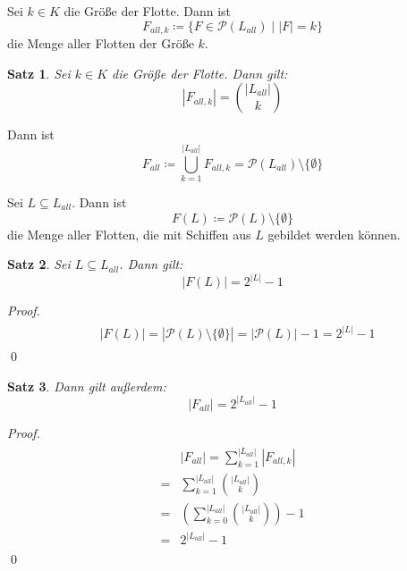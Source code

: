 \documentclass[a4paper,12pt]{llncs}
\numberwithin{equation}{section}
\newtheorem{satz}{Satz}
\begin{document}
\begin{definition}
Sei $k \in K$ die Größe der Flotte.
Dann ist
\[
F_{all,k} \coloneqq\{F \in \mathcal{P}(L_{all}) \mid |F| = k\}
\]
die Menge aller Flotten der Größe $k$.
\end{definition}

\begin{satz}
Sei $k \in K$ die Größe der Flotte.
Dann gilt:
\[
|F_{all,k}|=\binom{|L_{all}|}{k}
\]
\end{satz}

\begin{definition}
Dann ist
\[
F_{all} \coloneqq \bigcup_{k=1}^{|L_{all}|} F_{all,k} = \mathcal{P}(L_{all}) \setminus \{\emptyset\}
\]
\end{definition}

\begin{definition}
Sei $L \subseteq L_{all}$.
Dann ist
\[
F(L) \coloneqq \mathcal{P}(L) \setminus \{\emptyset\}
\]
die Menge aller Flotten, die mit Schiffen aus $L$ gebildet werden können.
\end{definition}

\begin{satz}
Sei $L \subseteq L_{all}$.
Dann gilt:
\[
|F(L)|=2^{|L|} - 1
\]
\end{satz}

\begin{proof}
\begin{align}
\begin{split}
&|F(L)|=|\mathcal{P}(L) \setminus \{\emptyset\}|=|\mathcal{P}(L)|-1=2^{|L|} - 1
\end{split}
\end{align}
\qed
\end{proof}

\begin{satz}
Dann gilt außerdem:
\[
|F_{all}|=2^{|L_{all}|} - 1
\]
\end{satz}

\begin{proof}
\begin{align}
\begin{split}
&|F_{all}|=\sum_{k=1}^{|L_{all}|} |F_{all,k}|\\
=&\sum_{k=1}^{|L_{all}|} \binom{|L_{all}|}{k} \\
=&\left( \sum_{k=0}^{|L_{all}|} \binom{|L_{all}|}{k} \right) - 1 \\
=&2^{|L_{all}|} - 1
\end{split}
\end{align}
\qed
\end{proof}
\end{document}
